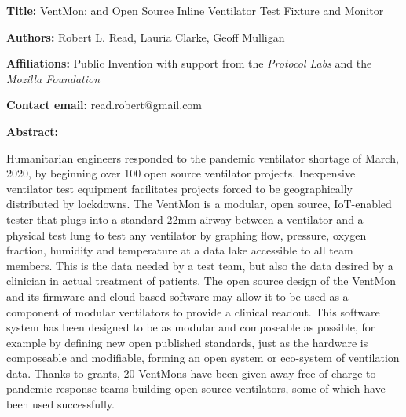 \documentclass[11pt, letterpaper]{article}
\begin{document}
\begin{flushleft}


\setlength{\parindent}{0pt}
\setlength{\parskip}{10pt}

\textbf{Title:} VentMon: and Open Source Inline Ventilator Test Fixture and Monitor

\textbf{Authors:} Robert L. Read, Lauria Clarke, Geoff Mulligan

\textbf{Affiliations:} Public Invention with support from the \textit{Protocol Labs} and the \textit{Mozilla Foundation}

\textbf{Contact email:} read.robert@gmail.com

\textbf{Abstract:}

Humanitarian engineers responded to the pandemic ventilator shortage of March,
2020, by beginning over 100 open source ventilator projects.
Inexpensive ventilator test equipment facilitates projects forced
to be geographically distributed by lockdowns.
The VentMon is a modular, open source, IoT-enabled
tester that plugs into a standard 22mm airway
between a ventilator and a physical test lung to test any ventilator
by graphing flow, pressure, oxygen fraction, humidity and temperature
at a data lake accessible to all team members. This is the data
needed by a test team, but also the data desired by a clinician in
actual treatment of patients. The open source design of the VentMon
and its firmware and cloud-based software may
allow it to be used as a component of modular ventilators to provide
a clinical readout. This software system has been designed to be as
modular and composeable as possible, for example by defining
new open published standards, just as the hardware is composeable
and modifiable, forming an open system or eco-system of ventilation data.
Thanks to grants, 20 VentMons have been given away
free of charge to pandemic response teams building open source ventilators,
some of which have been used successfully.




\end{flushleft}
\end{document}
